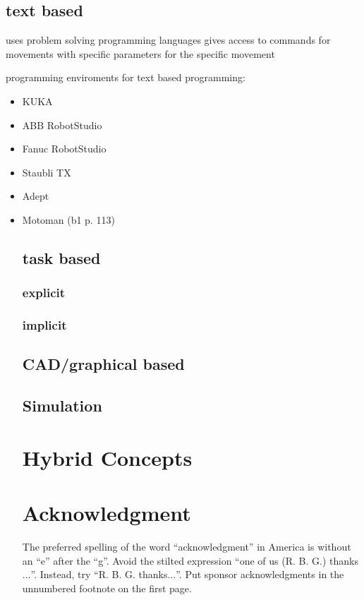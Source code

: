 \documentclass[conference]{IEEEtran}
\begin{document}
    \subsection{text based}

        uses problem solving programming languages 
        gives access to commands for movements with specific parameters for the specific movement
        
        programming enviroments for text based programming:
            \begin{itemize}
                \item KUKA 
                \item ABB RobotStudio
                \item Fanuc RobotStudio
                \item Staubli TX
                \item Adept
                \item Motoman
        (b1 p. 113)

    
    \subsection{task based}
        \subsubsection{explicit}
        \subsubsection{implicit}
    \subsection{CAD/graphical based}

    \subsection{Simulation}

\section{Hybrid Concepts}

\section*{Acknowledgment}

The preferred spelling of the word ``acknowledgment'' in America is without 
an ``e'' after the ``g''. Avoid the stilted expression ``one of us (R. B. 
G.) thanks $\ldots$''. Instead, try ``R. B. G. thanks$\ldots$''. Put sponsor 
acknowledgments in the unnumbered footnote on the first page.


\end{itemize}
\end{document}
